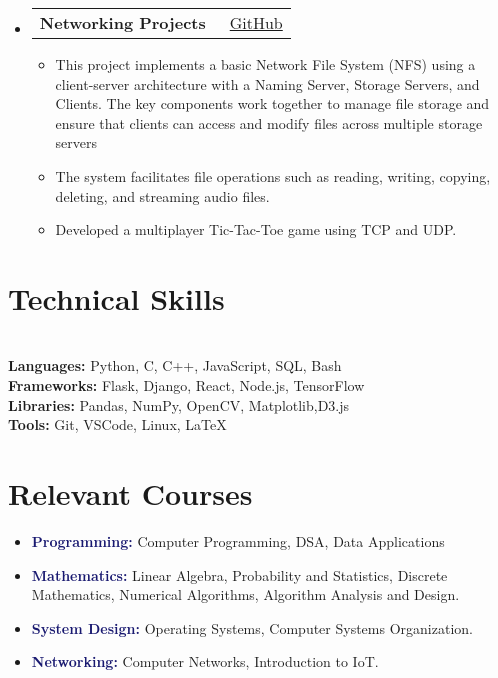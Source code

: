 \documentclass[a4paper,10pt]{article}
\makeatletter
\newcommand{\resumeItem}[1]{\item[\textcolor{bulletcolor}{\textbullet}] \small{#1}}
\newcommand{\resumeProjectHeading}[2]{
    \item
    \begin{tabular*}{0.97\textwidth}{l@{\extracolsep{\fill}}r}
        \textbf{#1} & {\small #2} \\
    \end{tabular*}\vspace{-7pt}
}
\makeatother
\begin{document}
\begin{itemize}[leftmargin=0.15in, label={}]
    \resumeProjectHeading
        {\textbf{Networking Projects}}{{\small\faGithub}\ \href{https://github.com/mayank3135432/Networking_File_System_Dummy}{GitHub}}
        \begin{itemize}[leftmargin=0.15in]
            \resumeItem{This project implements a basic Network File System (NFS) using a client-server architecture with a Naming Server, Storage Servers, and Clients. The key components work together to manage file storage and ensure that clients can access and modify files across multiple storage servers}
            \resumeItem{The system facilitates file operations such as reading, writing, copying, deleting, and streaming audio files.}
            \resumeItem{Developed a multiplayer Tic-Tac-Toe game using TCP and UDP.}
        \end{itemize}
\end{itemize}

\section{Technical Skills}
\begin{multicols}{2}
\textbf{}\\
\textbf{Languages:} Python, C, C++, JavaScript, SQL, Bash \\
\textbf{Frameworks:} Flask, Django, React, Node.js, TensorFlow \\
\textbf{Libraries:} Pandas, NumPy, OpenCV, Matplotlib,D3.js \\
\textbf{Tools:} Git, VSCode, Linux, LaTeX \\
\end{multicols}

\section{\textcolor{headercolor}{Relevant Courses}}
\begin{multicols}{2}
    \begin{itemize}[leftmargin=0.15in, label={}]
        \item \textbf{\textcolor{MidnightBlue}{Programming:}} Computer Programming, DSA, Data Applications
        \item \textbf{\textcolor{MidnightBlue}{Mathematics:}} Linear Algebra, Probability and Statistics, Discrete Mathematics, Numerical Algorithms, Algorithm Analysis and Design.
        \item \textbf{\textcolor{MidnightBlue}{System Design:}} Operating Systems, Computer Systems Organization.
        \item \textbf{\textcolor{MidnightBlue}{Networking:}} Computer Networks, Introduction to IoT.
    \end{itemize}
\end{multicols}
\end{document}
